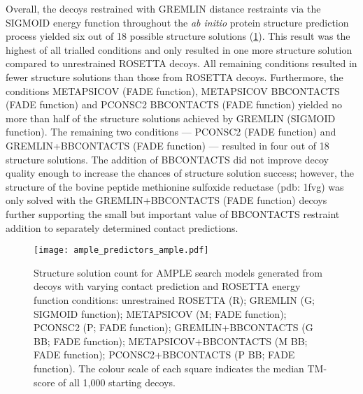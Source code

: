Overall, the decoys restrained with GREMLIN distance restraints via the SIGMOID energy function throughout the \textit{ab initio} protein structure prediction process yielded six out of 18 possible structure solutions (\cref{fig:ample_predictor_ample}). This result was the highest of all trialled conditions and only resulted in one more structure solution compared to unrestrained ROSETTA decoys. All remaining conditions resulted in fewer structure solutions than those from ROSETTA decoys. Furthermore, the conditions METAPSICOV (FADE function), METAPSICOV BBCONTACTS (FADE function) and PCONSC2 BBCONTACTS (FADE function) yielded no more than half of the structure solutions achieved by GREMLIN (SIGMOID function). The remaining two conditions --- PCONSC2 (FADE function) and GREMLIN+BBCONTACTS (FADE function) --- resulted in four out of 18 structure solutions. The addition of BBCONTACTS did not improve decoy quality enough to increase the chances of structure solution success; however, the structure of the bovine peptide methionine sulfoxide reductase (\gls{pdb}: 1fvg) was only solved with the GREMLIN+BBCONTACTS (FADE function) decoys further supporting the small but important value of BBCONTACTS restraint addition to separately determined contact predictions.

\begin{figure}[H]
    \centering
    \texttt{[image: ample\_predictors\_ample.pdf]}
    \caption[Structure solution count forom AMPLE-derived search models]{Structure solution count for AMPLE search models generated from decoys with varying contact prediction and ROSETTA energy function conditions: unrestrained ROSETTA (R); GREMLIN (G; SIGMOID function); METAPSICOV (M; FADE function); PCONSC2  (P; FADE function); GREMLIN+BBCONTACTS (G BB; FADE function); METAPSICOV+BBCONTACTS (M BB; FADE function); PCONSC2+BBCONTACTS (P BB; FADE function). The colour scale of each square indicates the median TM-score of all 1,000 starting decoys.}
    \label{fig:ample_predictor_ample}
\end{figure}

